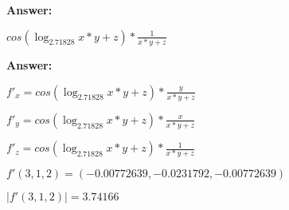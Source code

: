 \documentclass[12pt,a4paper,fleqn]{article}
\theoremstyle{definition}
\begin{document}
\textbf{Answer:}

$cos(\log_{ 2.71828 }{ x  *  y  +  z }) * \frac{ 1 }{ x  *  y  +  z }
$


\textbf{Answer:} 

$ f'_x = cos(\log_{ 2.71828 }{ x  *  y  +  z }) * \frac{ y }{ x  *  y  +  z }
$

$f'_y = cos(\log_{ 2.71828 }{ x  *  y  +  z }) * \frac{ x }{ x  *  y  +  z }
$

$f'_z = cos(\log_{ 2.71828 }{ x  *  y  +  z }) * \frac{ 1 }{ x  *  y  +  z }
$

$f'(3, 1, 2) = (-0.00772639, -0.0231792, -0.00772639)$

$|f'(3, 1, 2)| = 3.74166$
\end{document}
